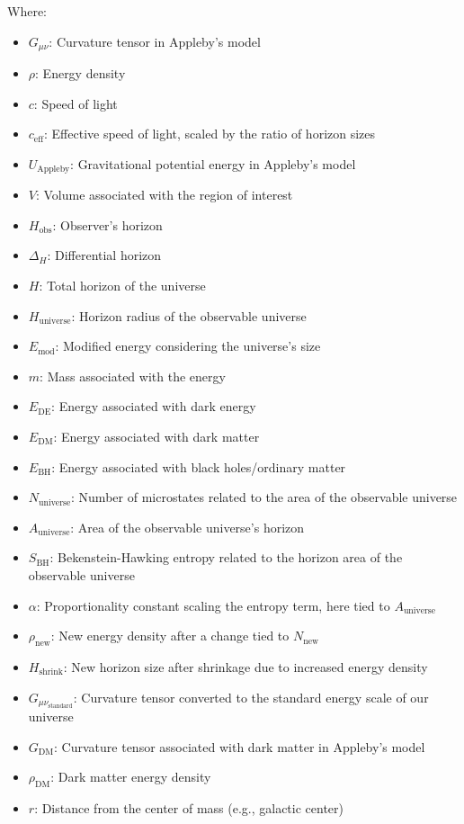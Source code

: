 \documentclass[a4paper, 11pt]{article}
\begin{document}
Where:
\begin{itemize}
\item \(G_{\mu\nu}\): Curvature tensor in Appleby’s model
\item \(\rho\): Energy density
\item \(c\): Speed of light
\item \(c_{\text{eff}}\): Effective speed of light, scaled by the ratio of horizon sizes
\item \(U_{\text{Appleby}}\): Gravitational potential energy in Appleby’s model
\item \(V\): Volume associated with the region of interest
\item \(H_{\text{obs}}\): Observer’s horizon
\item \(\Delta_H\): Differential horizon
\item \(H\): Total horizon of the universe
\item \(H_{\text{universe}}\): Horizon radius of the observable universe
\item \(E_{\text{mod}}\): Modified energy considering the universe’s size
\item \(m\): Mass associated with the energy
\item \(E_{\text{DE}}\): Energy associated with dark energy
\item \(E_{\text{DM}}\): Energy associated with dark matter
\item \(E_{\text{BH}}\): Energy associated with black holes/ordinary matter
\item \(N_{\text{universe}}\): Number of microstates related to the area of the observable universe
\item \(A_{\text{universe}}\): Area of the observable universe’s horizon
\item \(S_{\text{BH}}\): Bekenstein-Hawking entropy related to the horizon area of the observable universe
\item \(\alpha\): Proportionality constant scaling the entropy term, here tied to \(A_{\text{universe}}\)
\item \(\rho_{\text{new}}\): New energy density after a change tied to \(N_{\text{new}}\)
\item \(H_{\text{shrink}}\): New horizon size after shrinkage due to increased energy density
\item \(G_{\mu\nu_{\text{standard}}}\): Curvature tensor converted to the standard energy scale of our universe
\item \(G_{\text{DM}}\): Curvature tensor associated with dark matter in Appleby’s model
\item \(\rho_{\text{DM}}\): Dark matter energy density
\item \(r\): Distance from the center of mass (e.g., galactic center)
\end{itemize}
\end{document}
